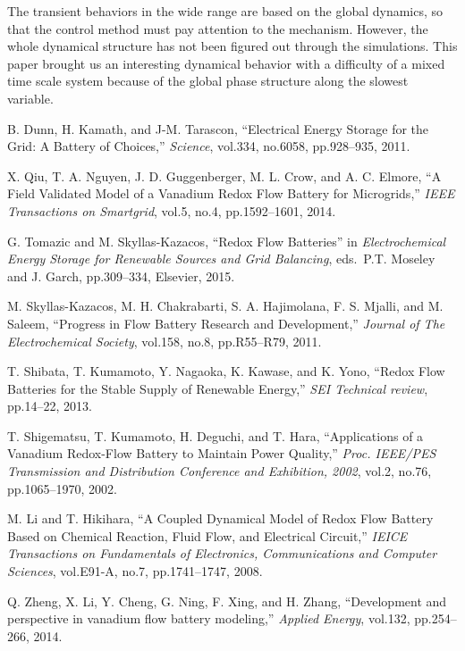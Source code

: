 \documentclass[a4paper]{article}
\begin{document}
The transient behaviors in the wide range are based on the global dynamics,
so that the control method must pay attention to the mechanism. 
However, the whole dynamical structure has not been figured out through the simulations. 
This paper brought us an interesting dynamical behavior with a difficulty of a mixed time scale system
because of the global phase structure along the slowest variable. 
\begin{thebibliography}{10}
B. Dunn, H. Kamath, and J-M. Tarascon,
``Electrical Energy Storage for the Grid: A Battery of Choices,''
{\it Science},
vol.334, no.6058, pp.928--935, 2011.

X. Qiu, T. A. Nguyen, J. D. Guggenberger, M. L. Crow, and A. C. Elmore,
``A Field Validated Model of a Vanadium Redox Flow Battery for Microgrids,''
{\it IEEE Transactions on Smartgrid},
vol.5, no.4, pp.1592--1601, 2014.

G. Tomazic and M. Skyllas-Kazacos,
``Redox Flow Batteries'' in
{\it Electrochemical Energy Storage for Renewable Sources and Grid Balancing},
  eds.\ P.T. Moseley and J. Garch,
pp.309--334,
Elsevier, 2015.

M. Skyllas-Kazacos, M. H. Chakrabarti, S. A. Hajimolana, F. S. Mjalli, and M.
  Saleem,
``Progress in Flow Battery Research and Development,''
{\it Journal of The Electrochemical Society},
vol.158, no.8, pp.R55--R79, 2011.

T. Shibata, T. Kumamoto, Y. Nagaoka, K. Kawase, and K. Yono,
``Redox Flow Batteries for the Stable Supply of Renewable Energy,''
{\it SEI Technical review},
pp.14--22, 2013.

 T. Shigematsu,  T. Kumamoto,  H. Deguchi, and  T. Hara,
``Applications of a Vanadium Redox-Flow Battery to Maintain Power Quality,''
{\it Proc. IEEE/PES Transmission and Distribution Conference and Exhibition, 2002},
vol.2, no.76, pp.1065--1970, 2002.

M. Li and T. Hikihara,
``A Coupled Dynamical Model of Redox Flow Battery Based on Chemical Reaction,
  Fluid Flow, and Electrical Circuit,''
{\it IEICE Transactions on Fundamentals of Electronics, Communications and
  Computer Sciences},
vol.E91-A, no.7, pp.1741--1747, 2008.

Q. Zheng, X. Li, Y. Cheng, G. Ning, F. Xing, and H. Zhang,
``Development and perspective in vanadium flow battery modeling,''
{\it Applied Energy},
vol.132, pp.254--266, 2014.


\end{thebibliography}
\end{document}
